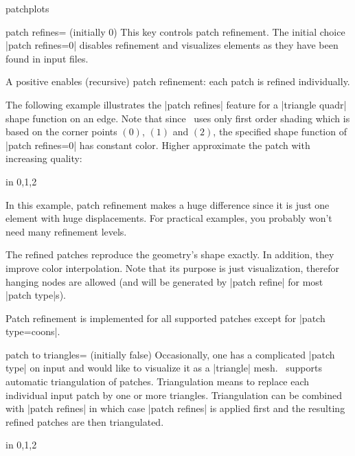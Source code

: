 \begin{pgfplotslibrary}{patchplots}
\begin{pgfplotskey}{patch refines= (initially 0)}
	This key controls patch refinement. The initial choice |patch refines=0| disables refinement and visualizes elements as they have been found in input files.

	A positive  enables (recursive) patch refinement: each patch is refined individually. 

	The following example illustrates the |patch refines| feature for a |triangle quadr| shape function on an edge. Note that since \PGFPlots\ uses only first order shading which is based on the corner points $(0)$, $(1)$ and $(2)$, the specified shape function of |patch refines=0| has constant color. Higher  approximate the patch with increasing quality:
\begin{codeexample}[]
\foreach \level in {0,1,2} {%
}
\end{codeexample}
	\noindent In this example, patch refinement makes a huge difference since it is just one element with huge displacements. For practical examples, you probably won't need many refinement levels.
	
	The refined patches reproduce the geometry's shape exactly. In addition, they improve color interpolation. Note that its purpose is just visualization, therefor hanging nodes are allowed (and will be generated by |patch refine| for most |patch type|s).

	Patch refinement is implemented for all supported patches except for |patch type=coons|.
\end{pgfplotskey}

\begin{pgfplotskey}{patch to triangles= (initially false)}
	Occasionally, one has a complicated |patch type| on input and would like to visualize it as a |triangle| mesh. \PGFPlots\ supports automatic triangulation of patches. Triangulation means to replace each individual input patch by one or more triangles. Triangulation can be combined with |patch refines| in which case |patch refines| is applied first and the resulting refined patches are then triangulated.
\begin{codeexample}[]
\foreach \level in {0,1,2} {%
	\begin{tikzpicture}
	\begin{axis}[
		nodes near coords={(\coordindex)},
		footnotesize,
		title={Triangulation + \level\ refines}]


\end{axis}
\end{tikzpicture}}
\end{codeexample}
\end{pgfplotskey}
\end{pgfplotslibrary}
